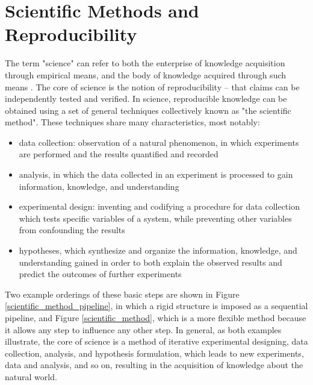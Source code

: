 \section{Scientific Methods and Reproducibility}
The term "science" can refer to both the enterprise of knowledge acquisition 
through empirical means, and the body of knowledge acquired through such means 
\cite{drummond2012reproducible}.
The core of science is the notion of reproducibility 
\cite{russell2013reproducibility, nih2014reproducibility} -- that claims can be 
independently tested and verified.  In science, reproducible knowledge can be 
obtained using a set of general techniques collectively known as "the 
scientific method".  These techniques share many characteristics, most notably:
\begin{itemize}
 \item data collection: observation of a natural phenomenon, in which 
 experiments are performed and the results quantified and recorded
 \item analysis, in which the data collected in an experiment is processed to 
 gain information, knowledge, and understanding
 \item experimental design: inventing and codifying a procedure for data 
 collection which tests specific variables of a system, while preventing 
 other variables from confounding the results
 \item hypotheses, which synthesize and organize the information, knowledge, 
 and understanding gained in order to both explain the observed results and 
 predict the outcomes of further experiments
\end{itemize}

Two example orderings of these basic steps are shown in 
Figure \ref{scientific_method_pipeline}, in which a rigid structure is
imposed as a sequential pipeline, and Figure \ref{scientific_method}, which 
is a more flexible method because it allows any step to influence any other 
step.  In general, as both examples illustrate, the core of science is a
method of iterative experimental designing, data collection, analysis, and 
hypothesis formulation, which leads to new experiments, data and analysis,  
and so on, resulting in the acquisition of knowledge about the natural world.

